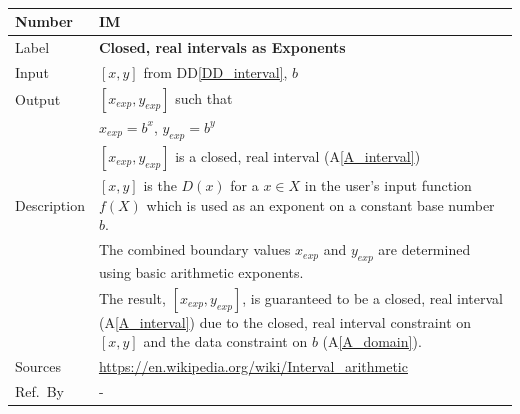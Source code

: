 \documentclass[12pt]{article}
\newcommand{\colAwidth}{0.13\textwidth}
\newcommand{\colBwidth}{0.82\textwidth}
\newcommand{\ddref}[1]{DD\ref{#1}}
\newcommand{\aref}[1]{A\ref{#1}}
\newcounter{instnum} %
\begin{document}
~\newline

\noindent
\begin{minipage}{\textwidth}
	\renewcommand*{\arraystretch}{1.5}
	\begin{tabular}{| p{\colAwidth} | p{\colBwidth}|}
		\hline
		\rowcolor[gray]{0.9}
		Number& IM{instnum}\theinstnum \label{I_exponents}\\
		\hline
		Label& \bf  Closed, real intervals as Exponents\\
		\hline
		Input&$[x, y]$ from \ddref{DD_interval}, $b$\\
		\hline
		Output&$[x_{exp}, y_{exp}]$ such that\\
		&$x_{exp} = b^x$, $y_{exp} = b^y$\\
		&$[x_{exp}, y_{exp}]$ is a closed, real interval (\aref{A_interval}) \\
		\hline
		Description&$[x, y]$ is the $D(x)$ for a $x \in X$ in the user's input 
		function $f(X)$ which is used as an exponent on a constant base number 
		$b$. \\
		&The combined boundary values $x_{exp}$ and  $y_{exp}$ are determined 
		using basic arithmetic exponents.\\
		& The result, $[x_{exp}, y_{exp}]$, is guaranteed to be a closed, real 
		interval (\aref{A_interval}) due to the closed, real interval 
		constraint on $[x, y]$ and the data constraint on $b$ (\aref{A_domain}).
		\\
		\hline
		Sources& \url{https://en.wikipedia.org/wiki/Interval_arithmetic} \\
		\hline
		Ref.\ By & -\\
		\hline
	\end{tabular}
\end{minipage}\\

~\newline
\end{document}
